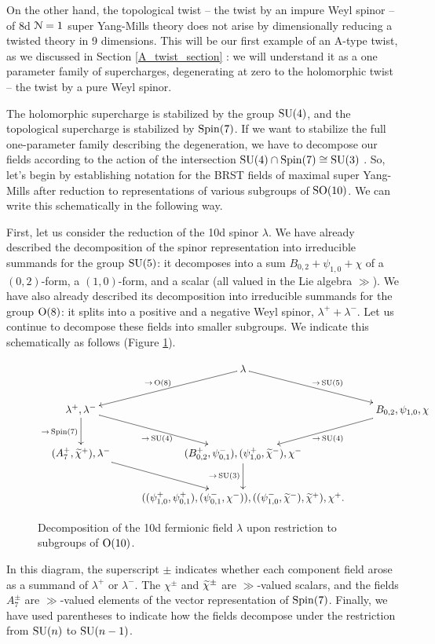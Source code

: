 \documentclass[10pt, oneside]{article}
\begin{document}
On the other hand, the topological twist -- the twist by an impure Weyl spinor -- of 8d $\mathcal{N}=1$ super Yang-Mills theory does not arise by dimensionally reducing a twisted theory in 9 dimensions.  This will be our first example of an A-type twist, as we discussed in Section \ref{A_twist_section} : we will understand it as a one parameter family of supercharges, degenerating at zero to the holomorphic twist -- the twist by a pure Weyl spinor.

The holomorphic supercharge is stabilized by the group $\mathrm{SU}(4)$, and the topological supercharge is stabilized by $\mathrm{Spin}(7)$.  If we want to stabilize the full one-parameter family describing the degeneration, we have to decompose our fields according to the action of the intersection $\mathrm{SU}(4) \cap \mathrm{Spin}(7) \cong \mathrm{SU}(3)$ .  So, let's begin by establishing notation for the BRST fields of maximal super Yang-Mills after reduction to representations of various subgroups of $\mathrm{SO}(10)$.  We can write this schematically in the following way.

First, let us consider the reduction of the 10d spinor $\lambda$.  We have already described the decomposition of the spinor representation into irreducible summands for the group $\mathrm{SU}(5)$: it decomposes into a sum $B_{0,2} + \psi_{1,0} + \chi$ of a $(0,2)$-form, a $(1,0)$-form, and a scalar (all valued in the Lie algebra $\gg$).  We have also already described its decomposition into irreducible summands for the group $\mathrm{O}(8)$: it splits into a positive and a negative Weyl spinor, $\lambda^+ + \lambda^-$.  Let us continue to decompose these fields into smaller subgroups.  We indicate this schematically as follows (Figure \ref{fig:8dfermiondecomp}).
\begin{figure}[!h]
\[
\xymatrix{
&\lambda \ar[dl]_{\to\,  \mr{O}(8)} \ar[dr]^{\to\,  \SU(5)} &\\
\lambda^+, \lambda^- \ar[dr]_{\to\,  \SU(4)} \ar[d]_{\to\,  \Spin(7)} &&B_{0,2}, \psi_{1,0}, \chi \ar[dl]^{\to\,  \SU(4)} \\
(A_7^+, \wt \chi^+), \lambda^- \ar[dr] &(B_{0,2}^+, \psi_{0,1}^-), (\psi_{1,0}^+, \wt \chi^-), \chi^- \ar[d]_{\to\,  \SU(3)} &\\
 &((\psi_{1,0}^+, \psi_{0,1}^+), (\psi_{0,1}^-, \chi^-)), ((\psi_{1,0}^-, \wt \chi^-), \wt \chi^+), \chi^+. &
}\]
\caption{Decomposition of the 10d fermionic field $\lambda$ upon restriction to subgroups of $\mathrm{O}(10)$.}
\label{fig:8dfermiondecomp}
\end{figure}
In this diagram, the superscript $\pm$ indicates whether each component field arose as a summand of $\lambda^+$ or $\lambda^-$.  The $\chi^\pm$ and $\widetilde{\chi}^\pm$ are $\gg$-valued scalars, and the fields $A_7^\pm$ are $\gg$-valued elements of the vector representation of $\mathrm{Spin}(7)$.  Finally, we have used parentheses to indicate how the fields decompose under the restriction from $\mathrm{SU}(n)$ to $\mathrm{SU}(n-1)$.
\end{document}
